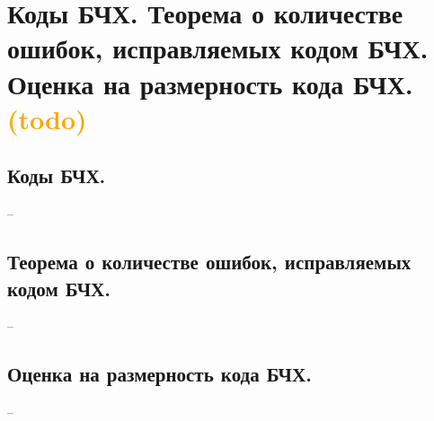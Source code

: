 \section{Коды БЧХ. Теорема о количестве ошибок, исправляемых кодом БЧХ. Оценка на размерность кода БЧХ. \textcolor{orange}{(todo)}}

\subsection{Коды БЧХ.}
--

\subsection{Теорема о количестве ошибок, исправляемых кодом БЧХ.}
--

\subsection{Оценка на размерность кода БЧХ.}
--